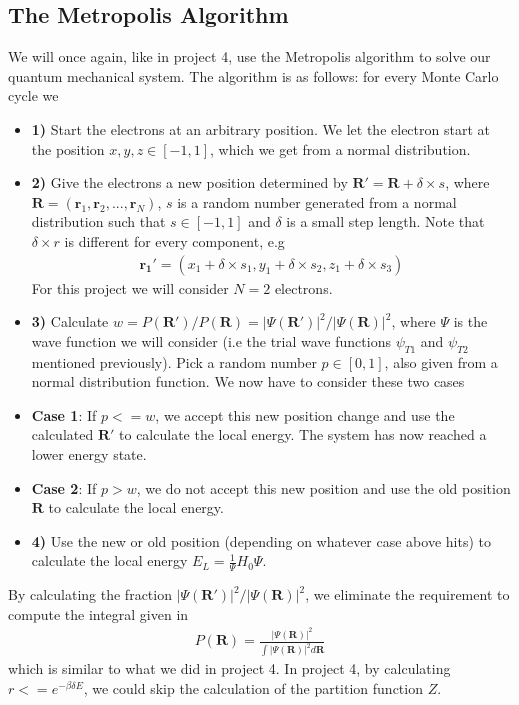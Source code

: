\documentclass[12pt]{article}
\begin{document}
\subsection{The Metropolis Algorithm}
We will once again, like in project 4, use the Metropolis algorithm to solve our quantum mechanical system. The algorithm is as follows: for every Monte Carlo cycle we 
\begin{itemize}
\item \textbf{1)} Start the electrons at an arbitrary position. We let the electron start at the position $x,y,z \in [-1,1]$, which we get from a normal distribution.

\item \textbf{2)} Give the electrons a new position determined by $\mathbf{R}' = \mathbf{R} + \delta\times s$, where $\mathbf{R} = (\mathbf{r}_1, \mathbf{r}_2, ..., \mathbf{r}_N)$, $s$ is a random number generated from a normal distribution such that $s\in [-1,1]$ and $\delta$ is a small step length. Note that $\delta \times r$ is different for every component, e.g
\begin{align*}
\mathbf{r_1}' = (x_1 + \delta\times s_1, y_1 + \delta\times s_2, z_1 + \delta\times s_3)
\end{align*} For this project we will consider $N=2$ electrons.

\item \textbf{3)} Calculate $w = P(\mathbf{R}')/P(\mathbf{R}) = |\Psi(\mathbf{R}')|^2/|\Psi(\mathbf{R})|^2$, where $\Psi$ is the wave function we will consider (i.e the trial wave functions $\psi_{T1}$ and $\psi_{T2}$ mentioned previously). Pick a random number $p\in [0,1]$, also given from a normal distribution function. We now have to consider these two cases

\item \textbf{Case 1}: If $p <= w$, we accept this new position change and use the calculated $\mathbf{R}'$ to calculate the local energy. The system has now reached a lower energy state.

\item \textbf{Case 2}: If $p > w$, we do not accept this new position and use the old position $\mathbf{R}$ to calculate the local energy.

\item \textbf{4)} Use the new or old position (depending on whatever case above hits) to calculate the local energy $E_L = \frac{1}{\Psi} H_0\Psi$. 
\end{itemize}
By calculating the fraction $|\Psi(\mathbf{R}')|^2/|\Psi(\mathbf{R})|^2$, we eliminate the requirement to compute the integral given in
\begin{align*}
P(\mathbf{R}) = \frac{|\Psi(\mathbf{R})|^2}{\int |\Psi(\mathbf{R})|^2 d\mathbf{R}}
\end{align*}
which is similar to what we did in project 4. In project 4, by calculating $r<= e^{-\beta \delta E}$, we could skip the calculation of the partition function $Z$. 
\end{document}
